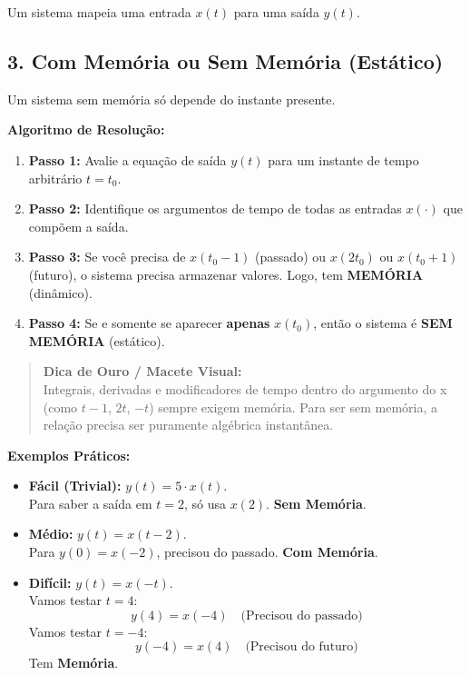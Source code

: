 Um sistema mapeia uma entrada \(x(t)\) para uma saída \(y(t)\).

\subsection{3. Com Memória ou Sem Memória (Estático)}\label{com-memuxf3ria-ou-sem-memuxf3ria-estuxe1tico}

Um sistema sem memória só depende do instante presente.

\textbf{Algoritmo de Resolução:}

\begin{enumerate}
\def\labelenumi{\arabic{enumi}.}
\tightlist
\item
  \textbf{Passo 1:} Avalie a equação de saída \(y(t)\) para um instante de tempo arbitrário \(t = t_0\).
\item
  \textbf{Passo 2:} Identifique os argumentos de tempo de todas as entradas \(x(\cdot)\) que compõem a saída.
\item
  \textbf{Passo 3:} Se você precisa de \(x(t_0 - 1)\) (passado) ou \(x(2t_0)\) ou \(x(t_0+1)\) (futuro), o sistema precisa armazenar valores. Logo, tem \textbf{MEMÓRIA} (dinâmico).
\item
  \textbf{Passo 4:} Se e somente se aparecer \textbf{apenas} \(x(t_0)\), então o sistema é \textbf{SEM MEMÓRIA} (estático).
\end{enumerate}

\begin{quote}
\textbf{Dica de Ouro / Macete Visual:}\\
Integrais, derivadas e modificadores de tempo dentro do argumento do x (como \(t-1\), \(2t\), \(-t\)) sempre exigem memória. Para ser sem memória, a relação precisa ser puramente algébrica instantânea.
\end{quote}

\textbf{Exemplos Práticos:}

\begin{itemize}
\item
  \textbf{Fácil (Trivial):} \(y(t) = 5 \cdot x(t)\).\\
  Para saber a saída em \(t=2\), só usa \(x(2)\). \textbf{Sem Memória}.
\item
  \textbf{Médio:} \(y(t) = x(t-2)\).\\
  Para \(y(0) = x(-2)\), precisou do passado. \textbf{Com Memória}.
\item
  \textbf{Difícil:} \(y(t) = x(-t)\).\\
  Vamos testar \(t = 4\):
  \[y(4) = x(-4) \quad \text{(Precisou do passado)}\]
  Vamos testar \(t = -4\):
  \[y(-4) = x(4) \quad \text{(Precisou do futuro)}\]
  Tem \textbf{Memória}.
\end{itemize}

